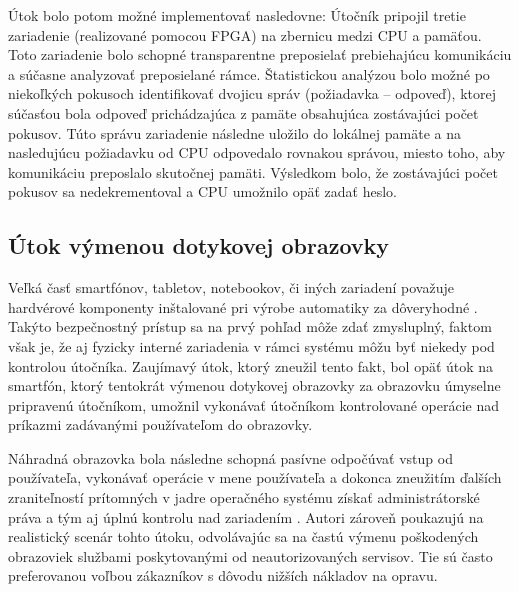 Útok bolo potom možné implementovať nasledovne: Útočník pripojil tretie zariadenie (realizované pomocou FPGA) na zbernicu medzi CPU a pamäťou. Toto zariadenie bolo schopné transparentne preposielať prebiehajúcu komunikáciu a súčasne analyzovať preposielané rámce. Štatistickou analýzou bolo možné po niekoľkých pokusoch identifikovať dvojicu správ (požiadavka -- odpoveď), ktorej súčasťou bola odpoveď prichádzajúca z pamäte obsahujúca zostávajúci počet pokusov. Túto správu zariadenie následne uložilo do lokálnej pamäte a na nasledujúcu požiadavku od CPU odpovedalo rovnakou správou, miesto toho, aby komunikáciu preposlalo skutočnej pamäti. Výsledkom bolo, že zostávajúci počet pokusov sa nedekrementoval a CPU umožnilo opäť zadať heslo.

\subsection{Útok výmenou dotykovej obrazovky}
Veľká časť smartfónov, tabletov, notebookov, či iných zariadení považuje hardvérové komponenty inštalované pri výrobe automatiky za dôveryhodné \cite{mitmTouch}. Takýto bezpečnostný prístup sa na prvý pohľad môže zdať zmysluplný, faktom však je, že aj fyzicky interné zariadenia v rámci systému môžu byť niekedy pod kontrolou útočníka. Zaujímavý útok, ktorý zneužil tento fakt, bol opäť útok na smartfón, ktorý tentokrát výmenou dotykovej obrazovky za obrazovku úmyselne pripravenú útočníkom, umožnil vykonávať útočníkom kontrolované operácie nad príkazmi zadávanými používateľom do obrazovky.

Náhradná obrazovka bola následne schopná pasívne odpočúvať vstup od používateľa, vykonávať operácie v mene používateľa a dokonca zneužitím ďalších zraniteľností prítomných v jadre operačného systému získať administrátorské práva a tým aj úplnú kontrolu nad zariadením \cite{mitmTouch}. Autori zároveň poukazujú na realistický scenár tohto útoku, odvolávajúc sa na častú výmenu poškodených obrazoviek službami poskytovanými od neautorizovaných servisov. Tie sú často preferovanou voľbou zákazníkov s dôvodu nižších nákladov na opravu.


